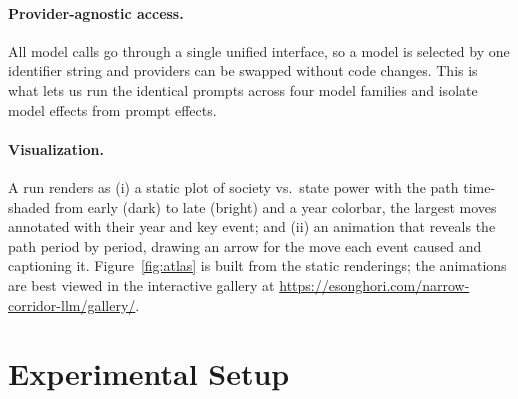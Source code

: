 \documentclass[twocolumn,10pt]{article}
\begin{document}
\paragraph{Provider-agnostic access.} All model calls go through a
single unified interface, so a model is selected by one identifier string and
providers can be swapped without code changes. This is what lets us run the
identical prompts across four model families and isolate model effects from
prompt effects.

\paragraph{Visualization.} A run renders as (i) a static plot of society vs.\
state power with the path time-shaded from early (dark) to late (bright) and a
year colorbar, the largest moves annotated with their year and key event; and
(ii) an animation that reveals the path period by period, drawing an arrow for
the move each event caused and captioning it. Figure~\ref{fig:atlas} is built
from the static renderings; the animations are best viewed in the interactive
gallery at \url{https://esonghori.com/narrow-corridor-llm/gallery/}.

\section{Experimental Setup}
\label{sec:setup}
\end{document}
